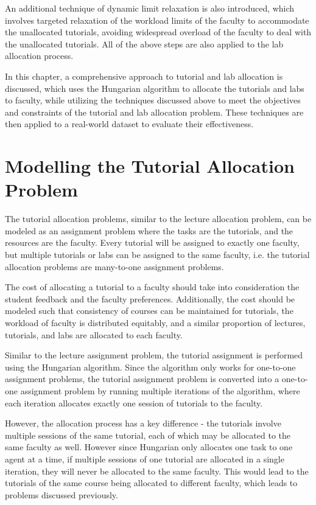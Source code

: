 An additional technique of dynamic limit relaxation is also introduced, which involves targeted relaxation of the workload limits of the faculty to accommodate the unallocated tutorials, avoiding widespread overload of the faculty to deal with the unallocated tutorials. All of the above steps are also applied to the lab allocation process.

In this chapter, a comprehensive approach to tutorial and lab allocation is discussed, which uses the Hungarian algorithm to allocate the tutorials and labs to faculty, while utilizing the techniques discussed above to meet the objectives and constraints of the tutorial and lab allocation problem. These techniques are then applied to a real-world dataset to evaluate their effectiveness.

\section{Modelling the Tutorial Allocation Problem}

The tutorial allocation problems, similar to the lecture allocation problem, can be modeled as an assignment problem where the tasks are the tutorials, and the resources are the faculty. Every tutorial will be assigned to exactly one faculty, but multiple tutorials or labs can be assigned to the same faculty, i.e. the tutorial allocation problems are many-to-one assignment problems.

The cost of allocating a tutorial to a faculty should take into consideration the student feedback and the faculty preferences. Additionally, the cost should be modeled such that consistency of courses can be maintained for tutorials, the workload of faculty is distributed equitably, and a similar proportion of lectures, tutorials, and labs are allocated to each faculty.

Similar to the lecture assignment problem, the tutorial assignment is performed using the Hungarian algorithm. Since the algorithm only works for one-to-one assignment problems, the tutorial assignment problem is converted into a one-to-one assignment problem by running multiple iterations of the algorithm, where each iteration allocates exactly one session of tutorials to the faculty.

However, the allocation process has a key difference - the tutorials involve multiple sessions of the same tutorial, each of which may be allocated to the same faculty as well. However since Hungarian only allocates one task to one agent at a time, if multiple sessions of one tutorial are allocated in a single iteration, they will never be allocated to the same faculty. This would lead to the tutorials of the same course being allocated to different faculty, which leads to problems discussed previously.

